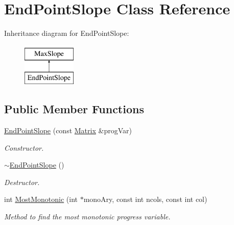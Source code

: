 \hypertarget{classEndPointSlope}{
\section{EndPointSlope Class Reference}
\label{da/d7d/classEndPointSlope}
}
Inheritance diagram for EndPointSlope:\begin{figure}[H]
\begin{center}
\leavevmode
\includegraphics[height=2cm]{da/d7d/classEndPointSlope}
\end{center}
\end{figure}
\subsection*{Public Member Functions}
\begin{DoxyCompactItemize}
\item 
\hyperlink{classEndPointSlope_aa1c680c5137b40a465d2433e636892ce}{EndPointSlope} (const \hyperlink{classMatrix}{Matrix} \&progVar)
\begin{DoxyCompactList}\small\item\em Constructor. \item\end{DoxyCompactList}\item 
\hypertarget{classEndPointSlope_a37cf0a75d426b64fc50a8a76f45beb1f}{
\hyperlink{classEndPointSlope_a37cf0a75d426b64fc50a8a76f45beb1f}{$\sim$EndPointSlope} ()}
\label{da/d7d/classEndPointSlope_a37cf0a75d426b64fc50a8a76f45beb1f}

\begin{DoxyCompactList}\small\item\em Destructor. \item\end{DoxyCompactList}\item 
int \hyperlink{classEndPointSlope_a70417721fe8a60669a67d19a7855bef5}{MostMonotonic} (int $\ast$monoAry, const int ncols, const int col)
\begin{DoxyCompactList}\small\item\em Method to find the most monotonic progress variable. \item\end{DoxyCompactList}\end{DoxyCompactItemize}


